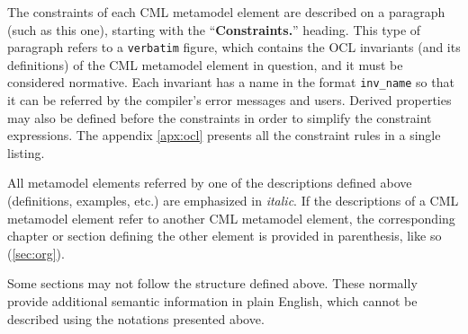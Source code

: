 \begin{constraints}
The constraints of each CML metamodel element are described
on a paragraph (such as this one),
starting with the ``\textbf{Constraints.}'' heading.
This type of paragraph refers to a \verb+verbatim+ figure,
which contains the OCL \cite{ocl} invariants
(and its definitions)
of the CML metamodel element in question,
and it must be considered normative.
Each invariant has a name in the format \verb+inv_name+
so that it can be referred by the compiler's error messages
and users.
Derived properties may also be defined before the constraints
in order to simplify the constraint expressions.
The appendix \ref{apx:ocl} presents all the constraint rules
in a single listing.
\end{constraints}

All metamodel elements referred by one of the descriptions defined above
(definitions, examples, etc.)
are emphasized in \emph{italic}.
If the descriptions of a CML metamodel element refer to another CML metamodel element,
the corresponding chapter or section defining the other element
is provided in parenthesis, like so (\ref{sec:org}).

Some sections may not follow the structure defined above.
These normally provide additional semantic information in plain English,
which cannot be described using the notations presented above.

